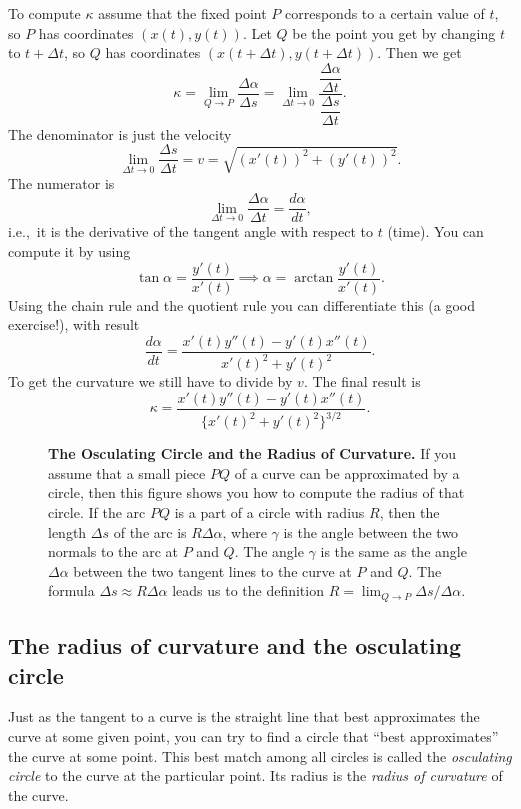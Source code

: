 To compute $\kappa$ assume that the fixed point $P$ corresponds to a
certain value of $t$, so $P$ has coordinates $(x(t), y(t))$.  Let $Q$
be the point you get by changing $t$ to $t+\Delta t$, so $Q$ has
coordinates  $(x(t+\Delta t), y(t+\Delta t))$.  Then we get
\[
\kappa
= \lim_{Q\to P}  \frac{\Delta\alpha} {\Delta s}
= \lim_{\Delta t\to 0}
\frac{\dfrac{\Delta\alpha} {\Delta t}} {\dfrac{\Delta s} {\Delta t}}.
\]
The denominator is just the velocity
\[
\lim_{\Delta t\to 0} \dfrac{\Delta s} {\Delta t} = v = \sqrt{(x'(t))^2
+ (y'(t))^2}.
\]
The numerator is
\[
\lim_{\Delta t\to 0}
\frac{\Delta\alpha} {\Delta t} = \frac{d\alpha} {dt},
\]
i.e.,~it is the derivative of the tangent angle with respect to $t$
(time).  You can compute it by using
\[
\tan \alpha = \frac{y'(t)} {x'(t)}
\implies
\alpha = \arctan \frac{y'(t)} {x'(t)}.
\]
Using the chain rule and the quotient rule you can differentiate this
(a good exercise!), with result
\begin{equation}
  \frac{d\alpha} {dt} = \frac{x'(t)y''(t) - y'(t)x''(t)} {x'(t)^2
  + y'(t)^2}.
  \label{eq:05curvature-computation}
\end{equation}
To get the curvature we still have to divide by $v$.  The final result
is
\begin{equation}
  \kappa = \frac{x'(t)y''(t) - y'(t)x''(t)}
                {\bigl\{x'(t)^2 + y'(t)^2\bigr\}^{3/2}}.
  \label{eq:05curvature-of-parametrized-curve}
\end{equation}




\begin{figure}[ht]
  \centering 
  \caption{\textbf{The Osculating Circle and the Radius of
      Curvature. } If you assume that a small piece $PQ$ of a curve
    can be approximated by a circle, then this figure shows you how to
    compute the radius of that circle.  If the arc $PQ$ is a part of a
    circle with radius $R$, then the length $\Delta s$ of the arc is
    $R \Delta\alpha$, where $\gamma$ is the angle between the two
    normals to the arc at $P$ and $Q$.  The angle $\gamma$ is the same
    as the angle $\Delta \alpha$ between the two tangent lines to the
    curve at $P$ and $Q$.  The formula $\Delta s \approx R\Delta
    \alpha$ leads us to the definition $R = \lim_{Q\to P} \Delta
    s/\Delta\alpha$.}
  \label{fig:05osculating-circle}
\end{figure}




\subsection{The radius of curvature and the osculating circle} %
\label{sec:radius-curvature-osculating-circle}
Just as the tangent to a curve is the straight line that best approximates the
curve at some given point, you can try to find a circle that ``best
approximates'' the curve at some point.  This best match among all circles is
called the \emph{osculating circle} to the curve at the particular point.  Its
radius is the \emph{radius of curvature} of the curve.




